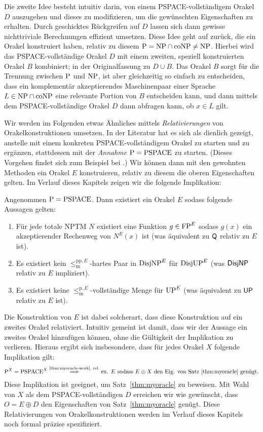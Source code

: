 Die zweite Idee besteht intuitiv darin, von einem PSPACE-vollständigem Orakel $D$ auszugehen und dieses zu modifizieren, um die gewünschten Eigenschaften zu erhalten. Durch geschicktes Rückgreifen auf $D$ lassen sich dann gewisse nichttriviale Berechnungen effizient umsetzen. Diese Idee geht auf \textcite{baker_relativizations_1975} zurück, die ein Orakel konstruiert haben, relativ zu diesem $\P=\NP\cap\coNP\neq\NP$. Hierbei wird das PSPACE-vollständige Orakel $D$ mit einem zweiten, speziell konstruierten Orakel $B$ kombiniert; in der Originalfassung zu $D\cup B$. Das Orakel $B$ sorgt für die Trennung zwischen $\P$ und $\NP$, ist aber gleichzeitig so einfach zu entscheiden, dass ein komplementär akzeptierendes Maschinenpaar einer Sprache $L\in\NP\cap\coNP$ eine relevante Portion von $B$ entscheiden kann, und dann mittels dem PSPACE-vollständige Orakel $D$ dann abfragen kann, ob $x\in L$ gilt.

Wir werden im Folgenden etwas Ähnliches mittels \emph{Relativierungen} von Orakelkonstruktionen umsetzen.
In der Literatur hat es sich als dienlich gezeigt, anstelle mit einem konkreten PSPACE-vollständigem Orakel zu starten und zu ergänzen, stattdessen mit der \emph{Annahme} $\P=\mathrm{PSPACE}$ zu starten. (Dieses Vorgehen findet sich zum Beispiel bei \cites{blum_generic_1987}{fortnow_separability_2002}{fenner_oracle_2003}.) 
Wir können dann mit den gewohnten Methoden ein Orakel $E$ konstruieren, relativ zu diesem die oberen Eigenschaften gelten. Im Verlauf dieses Kapitels zeigen wir die folgende Implikation:
\begin{theorem}\label{thm:myoracle-work}
    Angenommen $\P=\mathrm{PSPACE}$. Dann existiert ein Orakel $E$ sodass folgende Aussagen gelten:
    \begin{enumerate}
        \item Für jede totale NPTM $N$ existiert eine Funktion $g\in\FP^E$ sodass $g(x)$ ein akzeptierender Rechenweg von $N^E(x)$ ist (was äquivalent zu $\hQ$ relativ zu $E$ ist).
        \item Es existiert kein $\leq_\mathrm{m}^{\mathrm{pp},E}$-hartes Paar in $\DisjNP^E$ für $\DisjUP^E$ (was $\hDisjNP$ relativ zu $E$ impliziert).
        \item Es existiert keine $\leq_\mathrm{m}^{\mathrm{p},E}$-vollständige Menge für $\UP^E$ (was äquivalent zu $\hUP$ relativ zu $E$ ist).
    \end{enumerate}
\end{theorem}
Die Konstruktion von $E$ ist dabei solcherart, dass diese Konstruktion auf ein zweites Orakel relativiert. 
Intuitiv gemeint ist damit, dass wir der Aussage ein zweites Orakel hinzufügen können, ohne die Gültigkeit der Implikation zu verlieren. Hieraus ergibt sich insbesondere, dass für jedes Orakel $X$ folgende Implikation gilt:
\[ \P^X=\mathrm{PSPACE}^X \stackrel{\text{\ref{thm:myoracle-work}, rel.}}{\implies} \text{ex. $E$ sodass $E\oplus X$ den Eig. von Satz~\ref{thm:myoracle} genügt.} \]
Diese Implikation ist geeignet, um Satz~\ref{thm:myoracle} zu beweisen.
Mit Wahl von $X$ als dem PSPACE-vollständigen $D$ erreichen wir wie gewünscht, dass $O=E\oplus D$ den Eigenschaften von Satz~\ref{thm:myoracle} genügt.
Diese Relativierungen von Orakelkonstruktionen werden im Verlauf dieses Kapitels noch formal präzise spezifiziert.


